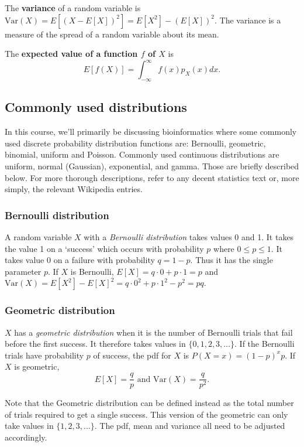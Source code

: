 \documentclass[11pt]{article}
\begin{document}
The {\bf variance} of a random variable is $\mathrm{Var}(X) = E[ (X - E[X])^2] =  E[X^2] - (E[X])^2$. The variance is a measure of the spread of a random variable about its mean.

The {\bf expected value of a function $f$ of $X$} is \[ E[f(X)] = \int_{-\infty}^{\infty} f(x) p_X(x) dx. \]



\subsection{Commonly used distributions}

In this course, we'll primarily be discussing bioinformatics where some commonly used discrete probability distribution functions are:  Bernoulli, geometric, binomial,  uniform and  Poisson.  Commonly used continuous  distributions are uniform, normal (Gaussian), exponential, and gamma.  Those are briefly described below.  For more thorough descriptions, refer to any decent statistics text or, more simply, the relevant Wikipedia entries.  


\subsubsection{Bernoulli distribution}

A random variable $X$ with a {\em Bernoulli distribution} takes values 0 and 1.  It takes the value 1 on a `success' which occurs with probability $p$ where $0 \leq p \leq 1$.  It takes value 0 on a failure with probability $q = 1-p$.  Thus it has the single parameter $p$.  If $X$ is Bernoulli, $E[X] = q\cdot 0 + p\cdot1 = p$ and $\mathrm{Var}(X) = E[X^2] - E[X]^2 = q \cdot 0^2 + p\cdot 1^2 - p^2  = pq$.


\subsubsection{Geometric distribution}

$X$ has a  {\em geometric distribution} when it is the number of Bernoulli trials that fail before the first success.  It therefore takes values in $\{0,1,2,3,\ldots\}$.  If the Bernoulli trials have probability $p$ of success, the pdf for $X$ is $P(X = x) = (1-p)^x p$. If $X$ is geometric, 
\[E[X] = \frac qp \mbox{  and } \mathrm{Var}(X) = \frac q{p^2}.\]

Note that the Geometric distribution can be defined instead as the total number of trials required to get a single success.  This version of the geometric can only take values in $\{1,2,3,\ldots\}$.  The pdf, mean and variance all need to be adjusted accordingly.
\end{document}
